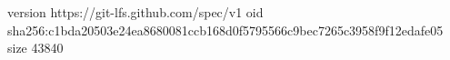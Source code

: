version https://git-lfs.github.com/spec/v1
oid sha256:c1bda20503e24ea8680081ccb168d0f5795566c9bec7265c3958f9f12edafe05
size 43840
